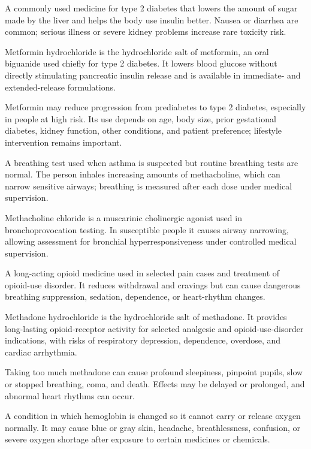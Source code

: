 A commonly used medicine for type 2 diabetes that lowers the amount of sugar made by the liver and helps the body use insulin better. Nausea or diarrhea are common; serious illness or severe kidney problems increase rare toxicity risk.

 Metformin hydrochloride is the hydrochloride salt of metformin, an oral biguanide used chiefly for type 2 diabetes. It lowers blood glucose without directly stimulating pancreatic insulin release and is available in immediate- and extended-release formulations.

 Metformin may reduce progression from prediabetes to type 2 diabetes, especially in people at
high risk. Its use depends on age, body size, prior gestational diabetes, kidney function,
other conditions, and patient preference; lifestyle intervention remains important.

 A breathing test used when asthma is suspected but routine breathing tests are normal. The person inhales increasing amounts of methacholine, which can narrow sensitive airways; breathing is measured after each dose under medical supervision.

 Methacholine chloride is a muscarinic cholinergic agonist used in bronchoprovocation testing. In susceptible people it causes airway narrowing, allowing assessment for bronchial hyperresponsiveness under controlled medical supervision.

 A long-acting opioid medicine used in selected pain cases and treatment of opioid-use disorder. It reduces withdrawal and cravings but can cause dangerous breathing suppression, sedation, dependence, or heart-rhythm changes.

 Methadone hydrochloride is the hydrochloride salt of methadone. It provides long-lasting opioid-receptor activity for selected analgesic and opioid-use-disorder indications, with risks of respiratory depression, dependence, overdose, and cardiac arrhythmia.

 Taking too much methadone can cause profound sleepiness, pinpoint pupils, slow or stopped breathing, coma, and death. Effects may be delayed or prolonged, and abnormal heart rhythms can occur.

 A condition in which hemoglobin is changed so it cannot carry or release oxygen normally. It may cause blue or gray skin, headache, breathlessness, confusion, or severe oxygen shortage after exposure to certain medicines or chemicals.


